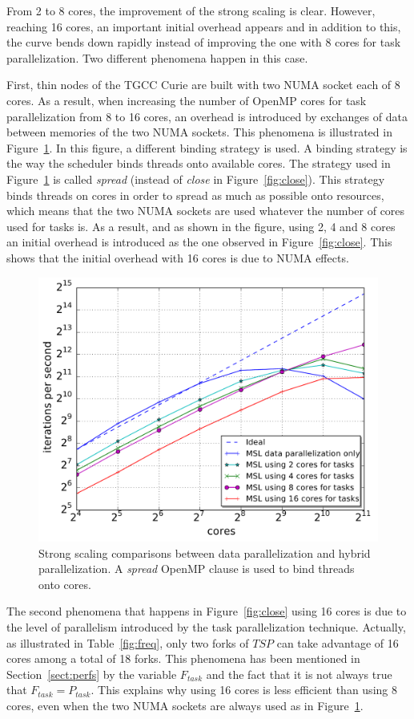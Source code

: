 From 2 to 8 cores, the improvement of the strong scaling is clear. However, reaching 16 cores, an important initial overhead appears and in addition to this, the curve bends down rapidly instead of improving the one with 8 cores for task parallelization. Two different phenomena happen in this case.

First, thin nodes of the TGCC Curie are built with two NUMA socket each of 8 cores. As a result, when increasing the number of OpenMP cores for task parallelization from 8 to 16 cores, an overhead is introduced by exchanges of data between memories of the two NUMA sockets. This phenomena is illustrated in Figure~\ref{fig:spread}. In this figure, a different binding strategy is used. A binding strategy is the way the scheduler binds threads onto available cores. The strategy used in Figure~\ref{fig:spread} is called \emph{spread} (instead of \emph{close} in Figure~\ref{fig:close}). This strategy binds threads on cores in order to spread as much as possible onto resources, which means that the two NUMA sockets are used whatever the number of cores used for tasks is. As a result, and as shown in the figure, using 2, 4 and 8 cores an initial overhead is introduced as the one observed in Figure~\ref{fig:close}. This shows that the initial overhead with 16 cores is due to NUMA effects.

\begin{figure}[!h]\begin{center}
  \includegraphics[width=.6\textwidth]{../results/task_scaling/500_200/base_spread_median.pdf}
  \caption{Strong scaling comparisons between data parallelization and hybrid parallelization. A \emph{spread} OpenMP clause is used to bind threads onto cores.}
  \label{fig:spread}
\end{center}\end{figure}

The second phenomena that happens in Figure~\ref{fig:close} using 16 cores is due to the level of parallelism introduced by the task parallelization technique. Actually, as illustrated in Table~\ref{fig:freq}, only two forks of $TSP$ can take advantage of 16 cores among a total of 18 forks. This phenomena has been mentioned in Section~\ref{sect:perfs} by the variable $F_{task}$ and the fact that it is not always true that $F_{task}=P_{task}$. This explains why using 16 cores is less efficient than using 8 cores, even when the two NUMA sockets are always used as in Figure~\ref{fig:spread}.


